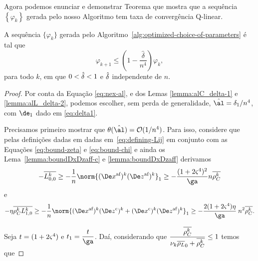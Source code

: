 Agora podemos enunciar e demonstrar  Teorema que mostra que a sequência $\left\{ \varphi_{k}\right\}$ gerada pelo nosso Algoritmo tem taxa de convergência Q-linear. 

\begin{teo}\label{lemma:next-phi-delta-n4}
A sequência $\{\varphi_{k}\}$ gerada pelo Algoritmo~\ref{alg:optimized-choice-of-parameters} é tal que
\begin{equation}
		\label{eq:varphi-delta-n4}
				\varphi_{k+1}\leq \left(1 - \frac{\hat{\delta}}{n^{4}}\right)\varphi_{k},
	\end{equation}
	para todo $k$, em que $0<\hat{\delta}<1$ e $\hat{\delta}$ independente de $n$.
\end{teo}


\begin{proof} Por conta da Equação \eqref{eq:nex-al}, e dos Lemas \ref{lemma:alC_delta-1} e \ref{lemma:alL_delta-2}, podemos escolher, sem perda de generalidade, $\nextal = \delta_{1}/n^{4}$, com $\de_{1}$ dado em \eqref{eq:delta1}. 

Precisamos  primeiro mostrar que $\theta(\nextal)= \Oset(1/n^{4})$. Para isso, considere que pelas definições dadas em dadas em~\eqref{eq:defining-Lij} em conjunto com  as Equações  \eqref{eq:bound-zeta} e \eqref{eq:bound-chi} e ainda  os Lema~\ref{lemma:boundDxDzaff-c} e \ref{lemma:boundDxDzaff} derivamos 
\[
- \dbvec{L_{0,0}^{k}} \geq - \dfrac{1}{n} \norm{ \dekx  \dekz }_1 \geq - \dfrac{(1 + 2\bdxzstar^{4})^{2} }{\ga} n\rhoCkb
\]
e 
\[
- \eta\rhoCkb  \dbvec{L_{1,0}^{k}} \geq - \dfrac{1}{n} \norm{ \dekx \Dekcoz + \Dekcox \dekz }_1 \geq - \dfrac{2(1+2\bdxzstar^{4})\eta }{\ga}\: n^{2}\rhoCkb.
\]



Seja $t = (1+2\varsigma^{4})$ e $t_1 = \dfrac{t}{\ga}$. 
Daí, considerando que $\dfrac{\overline{\rho_C^{k}} }{\nu_{k} \overline{\rho_L}_0 + \overline{\rho_C^{k}} }\leq 1$ temos que



\end{proof}
